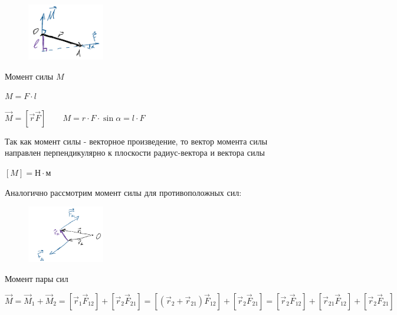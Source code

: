 \documentclass[12pt]{article}
\begin{document}
    \begin{enumerate}

        \begin{minipage}{\textwidth}
            \begin{figure}
                \includegraphics[width=0.3\textwidth]{physics1/images/physics1_2024_10_07_2}
            \end{figure}

            \item Момент силы $M$

            $M = F \cdot l$

            $\vec{M} = [\vec{r} \vec{F}] \qquad M = r \cdot F \cdot \sin\alpha = l \cdot F$

            Так как момент силы - векторное произведение, то вектор момента силы направлен перпендикулярно к плоскости
            радиус-вектора и вектора силы

            $[M] = \text{Н} \cdot \text{м}$


            Аналогично рассмотрим момент силы для противоположных сил:

            \begin{figure}
                \includegraphics[width=0.3\textwidth]{physics1/images/physics1_2024_10_07_3}
            \end{figure}

            \item Момент пары сил

            $\vec{M} = \vec{M}_1 + \vec{M}_2 = [\vec{r}_1 \vec{F}_{12}] + [\vec{r}_2 \vec{F}_{21}] =
            [(\vec{r}_2 + \vec{r}_{21}) \vec{F}_{12}] + [\vec{r}_2 \vec{F}_{21}] = [\vec{r}_2 \vec{F}_{12}] + [\vec{r}_{21} \vec{F}_{12}] + [\vec{r}_2 \vec{F}_{21}]$


\end{minipage}
\end{enumerate}
\end{document}
